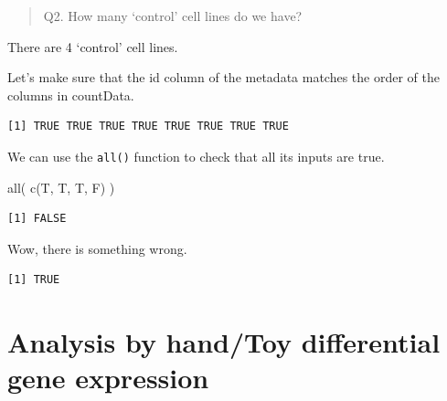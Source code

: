 \documentclass[
  letterpaper,
  DIV=11,
  numbers=noendperiod]{scrartcl}
\newenvironment{Shaded}{\begin{snugshade}}{\end{snugshade}}
\newcommand{\FunctionTok}[1]{\textcolor[rgb]{0.28,0.35,0.67}{#1}}
\newcommand{\NormalTok}[1]{\textcolor[rgb]{0.00,0.23,0.31}{#1}}
\newcommand{\SpecialCharTok}[1]{\textcolor[rgb]{0.37,0.37,0.37}{#1}}
\begin{document}
\begin{quote}
Q2. How many `control' cell lines do we have?
\end{quote}

There are 4 `control' cell lines.

Let's make sure that the id column of the metadata matches the order of
the columns in countData.

\begin{Shaded}
\end{Shaded}

\begin{verbatim}
[1] TRUE TRUE TRUE TRUE TRUE TRUE TRUE TRUE
\end{verbatim}

We can use the \texttt{all()} function to check that all its inputs are
true.

\begin{Shaded}
\begin{Highlighting}[]
\FunctionTok{all}\NormalTok{( }\FunctionTok{c}\NormalTok{(T, T, T, F) )}
\end{Highlighting}
\end{Shaded}

\begin{verbatim}
[1] FALSE
\end{verbatim}

Wow, there is something wrong.

\begin{Shaded}
\end{Shaded}

\begin{verbatim}
[1] TRUE
\end{verbatim}

\hypertarget{analysis-by-handtoy-differential-gene-expression}{%
\section{Analysis by hand/Toy differential gene
expression}\label{analysis-by-handtoy-differential-gene-expression}}
\end{document}
